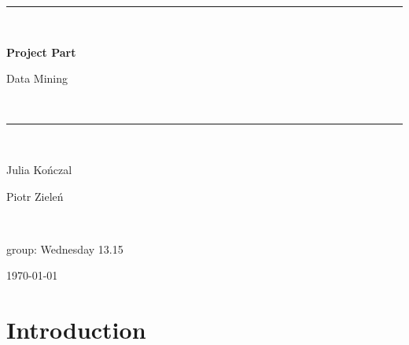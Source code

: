 \documentclass[11pt,a4paper]{article}\usepackage[]{graphicx}\usepackage[]{xcolor}
\newcommand{\RomanNumeralCaps}[1]
    {\MakeUppercase{\romannumeral #1}}
\begin{document}
	
	
	\begin{titlepage} 
		\newcommand{\HRule}{\rule{\linewidth}{0.5mm}} 
		
		\center 
		
		
		
		\HRule\\[0.4cm]
		
		{\huge\bfseries Project Part \RomanNumeralCaps{1}

			
			Data Mining}\\[0.4cm] 
		
		\HRule\\[1.5cm]
		
		
		\begin{minipage}{0.4\textwidth}
			\begin{flushleft}
				\large
				
				Julia Kończal
				
				Piotr Zieleń 
			\end{flushleft}
		\end{minipage}
		~
		\begin{minipage}{0.4\textwidth}
			\begin{flushright}
				\large
				group: Wednesday 13.15
				
				
				
				
				
				
				
				
				
			\end{flushright}
		\end{minipage}
		
		
		
		\vfill\vfill\vfill 	\vspace{400px}
		
		
		{\large \today} 
		
		\vfill 
		
	\end{titlepage}
	
	\newpage
	
	\newpage
	
	\tableofcontents
	\newpage
	\section{Introduction}

	
\end{document}

